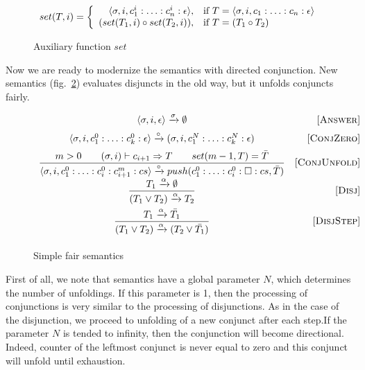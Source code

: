\begin{figure}[h!]
\[
set(T, i) =
\left\{
\begin{array}{rl}
\langle \sigma, i, c_1^i : \ldots : c_n^i : \epsilon \rangle, & \mbox{if } T = \langle \sigma, i, c_1 : \ldots : c_n : \epsilon \rangle \\
(set(T_1, i) \circ set(T_2, i)), & \mbox{if } T = (T_1 \circ T_2)
\end{array}
\right.
\]
\caption{Auxiliary function $set$}
\label{fair:set-semantics}
\end{figure}

Now we are ready to modernize the semantics with directed conjunction. New semantics (fig.~\ref{fair:naive-semantics}) evaluates disjuncts in the old way, but it unfolds conjuncts fairly.

\begin{figure}[h!]
\[\begin{array}{cr}

      {\langle \sigma, i, \epsilon \rangle \xrightarrow{\sigma} \emptyset}  
&     \mbox{[\textsc{Answer}]} \\[2mm]
      {\langle \sigma, i, c_1^0 : \ldots : c_k^0 : \epsilon \rangle \xrightarrow{\circ} (\sigma, i, c_1^N : \ldots : c_k^N : \epsilon)}
&     \mbox{[\textsc{ConjZero}]} \\[2mm]
\dfrac{m > 0 \qquad (\sigma, i) \vdash c_{i+1} \Rightarrow T \qquad set(m - 1, T) = \bar{T}}
      {\langle \sigma, i, c_1^0 : \ldots : c_i^0 : c_{i+1}^m : cs \rangle \xrightarrow{\circ} push(c_1^0 : \ldots : c_i^0 : \Box : cs, \bar{T})}
&     \mbox{[\textsc{ConjUnfold}]} \\[2mm]
\dfrac{T_1 \xrightarrow{\alpha} \emptyset}
      {(T_1 \lor T_2) \xrightarrow{\alpha} T_2}
&     \mbox{[\textsc{Disj}]} \\[4mm]
\dfrac{T_1 \xrightarrow{\alpha} \bar{T_1}}
      {(T_1 \lor T_2) \xrightarrow{\alpha} (T_2 \lor\bar{T_1})}
&     \mbox{[\textsc{DisjStep}]} \\[4mm]
\end{array}\]
\caption{Simple fair semantics}
\label{fair:naive-semantics}
\end{figure}

First of all, we note that semantics have a global parameter $N$, which determines the number of unfoldings. 
If this parameter is 1, then the processing of conjunctions is very similar to the processing of disjunctions. 
As in the case of the disjunction, we proceed to unfolding of a new conjunct after each step.If the parameter $N$ is tended to infinity, then the conjunction will become directional. Indeed, counter of the leftmost conjunct is never equal to zero and this conjunct will unfold until exhaustion.

